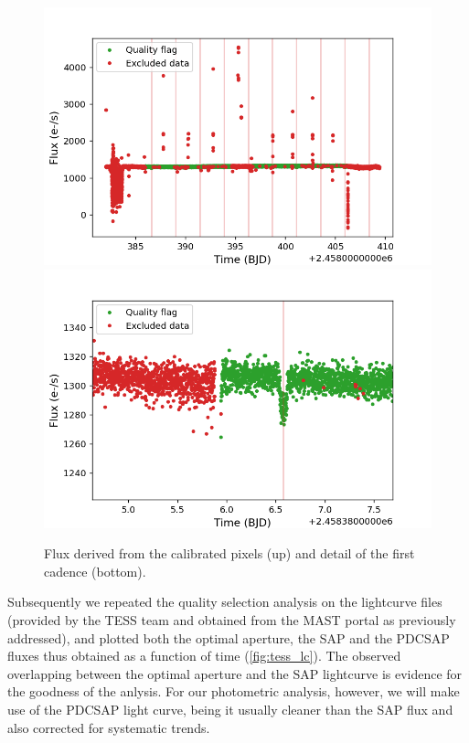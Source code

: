 \documentclass[a4paper,11pt,twocolumn]{article}
\begin{document}
\begin{figure}
    \centering
    \includegraphics[scale=0.3, angle=0]{../pictures/tess/tess.png}
    \includegraphics[scale=0.3, angle=0]{../pictures/tess/zoom.png}	
    \caption{Flux derived from the calibrated pixels (up) and detail of the first cadence (bottom).}
    \label{fig:tess}
\end{figure}



Subsequently we repeated the quality selection analysis on the lightcurve files (provided by the 
TESS team and obtained from the MAST portal as previously addressed), and plotted both the optimal 
aperture, the SAP and the PDCSAP fluxes thus obtained as a function of time (\ref{fig:tess_lc}). 
The observed overlapping between the optimal aperture and the SAP lightcurve is evidence for the goodness 
of the anlysis. For our photometric analysis, however, we will make use of 
the PDCSAP light curve, being it usually cleaner than the SAP flux and also 
corrected for systematic trends.
\end{document}
